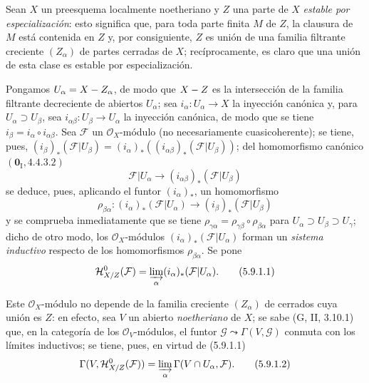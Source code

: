 \begin{env}[5.9.1]
\label{IV.2.s5.9.1-fr}
Sean $X$ un preesquema localmente noetheriano y $Z$ una parte de $X$
\emph{estable por especialización}: esto significa que, para toda parte finita
$M$ de $Z$, la clausura de $M$ está contenida en $Z$ y, por consiguiente,
$Z$ es unión de una familia filtrante creciente $(Z_\alpha)$ de partes
cerradas de $X$; recíprocamente, es claro que una unión de esta clase es
estable por especialización.

Pongamos $U_\alpha=X- Z_\alpha$, de modo que $X- Z$ es la intersección de la
familia filtrante decreciente de abiertos $U_\alpha$; sea
$i_\alpha:U_\alpha\to X$ la inyección canónica y, para
$U_\alpha\supset U_\beta$, sea $i_{\alpha\beta}:U_\beta\to U_\alpha$ la
inyección canónica, de modo que se tiene
$i_\beta=i_\alpha\circ i_{\alpha\beta}$. Sea $\mathcal F$ un
$\mathcal O_X$-módulo (no necesariamente cuasicoherente); se tiene, pues,
$(i_\beta)_*(\mathcal F|U_\beta)
=(i_\alpha)_*((i_{\alpha\beta})_*(\mathcal F|U_\beta))$;
del homomorfismo canónico $(\mathbf{0}_{\mathrm I},4.4.3.2)$
\[
\mathcal F|U_\alpha\longrightarrow
(i_{\alpha\beta})_*(\mathcal F|U_\beta)
\]
se deduce, pues, aplicando el funtor $(i_\alpha)_*$, un homomorfismo
\[
\rho_{\beta\alpha}:(i_\alpha)_*(\mathcal F|U_\alpha)
\longrightarrow(i_\beta)_*(\mathcal F|U_\beta)
\]
y se comprueba inmediatamente que se tiene
$\rho_{\gamma\alpha}=\rho_{\gamma\beta}\circ\rho_{\beta\alpha}$ para
$U_\alpha\supset U_\beta\supset U_\gamma$; dicho de otro modo, los
$\mathcal O_X$-módulos $(i_\alpha)_*(\mathcal F|U_\alpha)$ forman un
\emph{sistema inductivo} respecto de los homomorfismos
$\rho_{\beta\alpha}$. Se pone
\begin{equation}
\mathcal H^0_{X/Z}(\mathcal F)
=\varinjlim_\alpha(i_\alpha)_*(\mathcal F|U_\alpha).
\tag{5.9.1.1}\label{IV.2.s5.9.1.1-fr}
\end{equation}

Este $\mathcal O_X$-módulo no depende de la familia creciente
$(Z_\alpha)$ de cerrados cuya unión es $Z$: en efecto, sea $V$ un abierto
\emph{noetheriano} de $X$; se sabe (G, II, 3.10.1) que, en la categoría
de los $\mathcal O_V$-módulos, el funtor
$\mathcal G\leadsto\Gamma(V,\mathcal G)$ conmuta con los límites inductivos;
se tiene, pues, en virtud de (5.9.1.1)
\begin{equation}
\Gamma(V,\mathcal H^0_{X/Z}(\mathcal F))
=\varinjlim_\alpha\Gamma(V\cap U_\alpha,\mathcal F).
\tag{5.9.1.2}\label{IV.2.s5.9.1.2-fr}
\end{equation}


\end{env}
